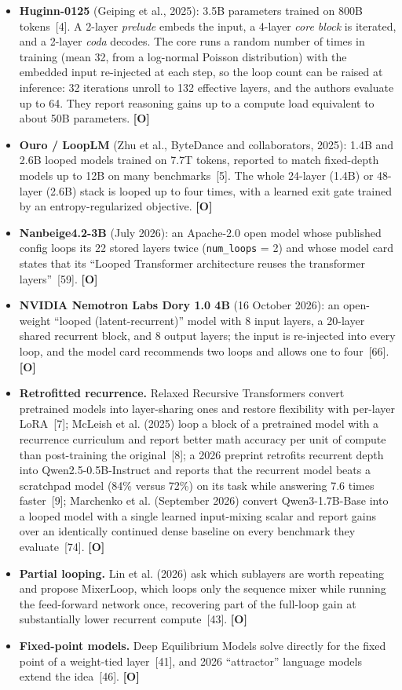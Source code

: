 \documentclass[11pt,letterpaper]{article}
\newcommand{\mO}{\textcolor{sensorteal}{\textbf{[O]}}}
\newcommand{\cfg}[1]{\texttt{\small #1}}
\begin{document}
\begin{itemize}
  \item \textbf{Huginn-0125} (Geiping et al., 2025): 3.5B parameters trained on 800B tokens~[4]. A 2-layer \emph{prelude} embeds the input, a 4-layer \emph{core block} is iterated, and a 2-layer \emph{coda} decodes. The core runs a random number of times in training (mean 32, from a log-normal Poisson distribution) with the embedded input re-injected at each step, so the loop count can be raised at inference: 32 iterations unroll to 132 effective layers, and the authors evaluate up to 64. They report reasoning gains up to a compute load equivalent to about 50B parameters. \mO
  \item \textbf{Ouro / LoopLM} (Zhu et al., ByteDance and collaborators, 2025): 1.4B and 2.6B looped models trained on 7.7T tokens, reported to match fixed-depth models up to 12B on many benchmarks~[5]. The whole 24-layer (1.4B) or 48-layer (2.6B) stack is looped up to four times, with a learned exit gate trained by an entropy-regularized objective. \mO
  \item \textbf{Nanbeige4.2-3B} (July 2026): an Apache-2.0 open model whose published config loops its 22 stored layers twice (\cfg{num\_loops} = 2) and whose model card states that its ``Looped Transformer architecture reuses the transformer layers''~[59]. \mO
  \item \textbf{NVIDIA Nemotron Labs Dory 1.0 4B} (16 October 2026): an open-weight ``looped (latent-recurrent)'' model with 8 input layers, a 20-layer shared recurrent block, and 8 output layers; the input is re-injected into every loop, and the model card recommends two loops and allows one to four~[66]. \mO
  \item \textbf{Retrofitted recurrence.} Relaxed Recursive Transformers convert pretrained models into layer-sharing ones and restore flexibility with per-layer LoRA~[7]; McLeish et al. (2025) loop a block of a pretrained model with a recurrence curriculum and report better math accuracy per unit of compute than post-training the original~[8]; a 2026 preprint retrofits recurrent depth into Qwen2.5-0.5B-Instruct and reports that the recurrent model beats a scratchpad model (84\% versus 72\%) on its task while answering 7.6 times faster~[9]; Marchenko et al. (September 2026) convert Qwen3-1.7B-Base into a looped model with a single learned input-mixing scalar and report gains over an identically continued dense baseline on every benchmark they evaluate~[74]. \mO
  \item \textbf{Partial looping.} Lin et al. (2026) ask which sublayers are worth repeating and propose MixerLoop, which loops only the sequence mixer while running the feed-forward network once, recovering part of the full-loop gain at substantially lower recurrent compute~[43]. \mO
  \item \textbf{Fixed-point models.} Deep Equilibrium Models solve directly for the fixed point of a weight-tied layer~[41], and 2026 ``attractor'' language models extend the idea~[46]. \mO
\end{itemize}
\end{document}
